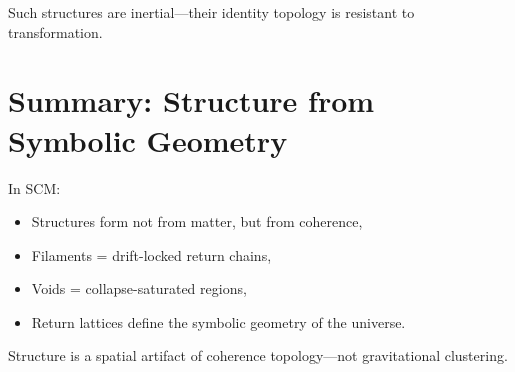 Such structures are inertial—their identity topology is resistant to transformation.

\section{Summary: Structure from Symbolic Geometry} \label{sec:lattice-summary}

In SCM:
\begin{itemize}
  \item Structures form not from matter, but from coherence,
  \item Filaments = drift-locked return chains,
  \item Voids = collapse-saturated regions,
  \item Return lattices define the symbolic geometry of the universe.
\end{itemize}

Structure is a spatial artifact of coherence topology—not gravitational clustering.

